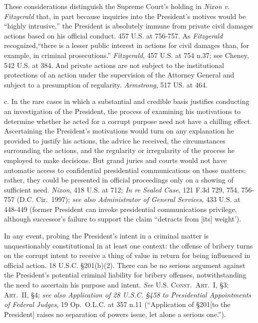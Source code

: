 These considerations distinguish the Supreme Court’s holding in \textit{Nixon v. Fitzgerald} that, in part because inquiries into the President’s motives would be “highly intrusive,” the President is absolutely immune from private civil damages actions based on his official conduct. 457 U.S. at 756-757.
As \textit{Fitzgerald} recognized,“there is a lesser public interest in actions for civil damages than, for example, in criminal prosecutions.”
\textit{Fitzgerald}, 457 U.S. at 754 n.37; see Cheney, 542 U.S. at 384.
And private actions are not subject to the institutional protections of an action under the supervision of the Attorney General and subject to a presumption of regularity.
\textit{Armstrong}, 517 US. at 464.

c. In the rare cases in which a substantial and credible basis justifies conducting an investigation of the President, the process of examining his motivations to determine whether he acted for a corrupt purpose need not have a chilling effect.
Ascertaining the President’s motivations would turn on any explanation he provided to justify his actions, the advice he received, the circumstances surrounding the actions, and the regularity or irregularity of the process he employed to make decisions.
But grand juries and courts would not have automatic access to confidential presidential communications on those matters; rather, they could be presented in official proceedings only on a showing of sufficient need.
\textit{Nixon}, 418 U.S. at 712;
\textit{In re Sealed Case}, 121 F.3d 729, 754, 756-757 (D.C. Cir.~1997);
\textit{see also Administrator of General Services}, 433 U.S. at 448-449 (former President can invoke presidential communications privilege, although successor’s failure to support the claim “detracts from [its] weight’).

In any event, probing the President’s intent in a criminal matter is unquestionably constitutional in at least one context: the offense of bribery turns on the corrupt intent to receive a thing of value in return for being influenced in official action.
18 U.S.C. \S 201(b)(2).
There can be no serious argument against the President’s potential criminal liability for bribery offenses, notwithstanding the need to ascertain his purpose and intent.
\textit{See} \textsc{U.S. Const.\ Art.~I}, \S 3; \textsc{Art.~II}, \S 4;
\textit{see also Application of 28 U.S.C. \S 458 to Presidential Appointments of Federal Judges}, 19 Op.\ O.L.C. at 357 n.11 (“Application of \S 201[to the President] raises no separation of powers issue, let alone a serious one.”).

